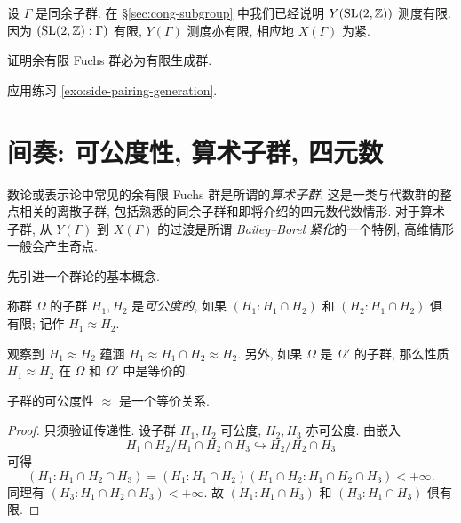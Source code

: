 \begin{example}
	设 $\Gamma$ 是同余子群. 在 \S\ref{sec:cong-subgroup} 中我们已经说明 $Y(\operatorname{SL}(2,\mathbb{Z}))$ 测度有限. 因为 $(\operatorname{SL}(2,\mathbb{Z}) : \Gamma)$ 有限, $Y(\Gamma)$ 测度亦有限, 相应地 $X(\Gamma)$ 为紧.
\end{example}

\begin{exercise}\label{exo:Fuchsian-1st-generation}
	证明余有限 Fuchs 群必为有限生成群.

	\begin{hint}
		应用练习 \ref{exo:side-pairing-generation}.
	\end{hint}
\end{exercise}

\section{间奏: 可公度性, 算术子群, 四元数}\label{sec:quaternion}
数论或表示论中常见的余有限 Fuchs 群是所谓的\emph{算术子群}, 这是一类与代数群的整点相关的离散子群, 包括熟悉的同余子群和即将介绍的四元数代数情形. 对于算术子群, 从 $Y(\Gamma)$ 到 $X(\Gamma)$ 的过渡是所谓 \emph{Bailey--Borel 紧化}的一个特例, 高维情形一般会产生奇点.

先引进一个群论的基本概念.
\begin{definition}\label{def:commensurable}  
	称群 $\Omega$ 的子群 $H_1, H_2$ 是\emph{可公度的}, 如果 $(H_1: H_1 \cap H_2)$ 和 $(H_2: H_1 \cap H_2)$ 俱有限; 记作 $H_1 \approx H_2$.
\end{definition}

观察到 $H_1 \approx H_2$ 蕴涵 $H_1 \approx H_1 \cap H_2 \approx H_2$. 另外, 如果 $\Omega$ 是 $\Omega'$ 的子群, 那么性质 $H_1 \approx H_2$ 在 $\Omega$ 和 $\Omega'$ 中是等价的.

\begin{lemma}\label{prop:commensurable}
	子群的可公度性 $\approx$ 是一个等价关系.
\end{lemma}
\begin{proof}
	只须验证传递性. 设子群 $H_1, H_2$ 可公度, $H_2, H_3$ 亦可公度. 由嵌入
	\[ H_1 \cap H_2 \big/ H_1 \cap H_2 \cap H_3 \hookrightarrow H_2 \big/ H_2 \cap H_3 \]
	可得
	\[ (H_1 : H_1 \cap H_2 \cap H_3) = (H_1 : H_1 \cap H_2) (H_1 \cap H_2 : H_1 \cap H_2 \cap H_3) < +\infty. \]
	同理有 $(H_3: H_1 \cap H_2 \cap H_3) < +\infty$. 故 $(H_1:H_1 \cap H_3)$ 和 $(H_3:H_1 \cap H_3)$ 俱有限.
\end{proof}

